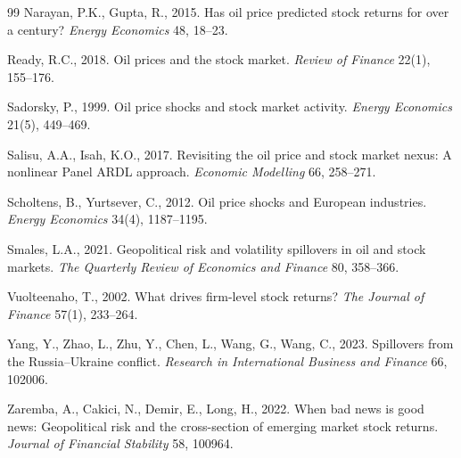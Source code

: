 \documentclass[12pt,preprint,authoryear]{elsarticle}
\begin{document}
\begin{thebibliography}{99}
Narayan, P.K., Gupta, R., 2015. Has oil price predicted stock returns for over a century? \textit{Energy Economics} 48, 18--23.

Ready, R.C., 2018. Oil prices and the stock market. \textit{Review of Finance} 22(1), 155--176.

Sadorsky, P., 1999. Oil price shocks and stock market activity. \textit{Energy Economics} 21(5), 449--469.

Salisu, A.A., Isah, K.O., 2017. Revisiting the oil price and stock market nexus: A nonlinear Panel ARDL approach. \textit{Economic Modelling} 66, 258--271.

Scholtens, B., Yurtsever, C., 2012. Oil price shocks and European industries. \textit{Energy Economics} 34(4), 1187--1195.

Smales, L.A., 2021. Geopolitical risk and volatility spillovers in oil and stock markets. \textit{The Quarterly Review of Economics and Finance} 80, 358--366.

Vuolteenaho, T., 2002. What drives firm-level stock returns? \textit{The Journal of Finance} 57(1), 233--264.

Yang, Y., Zhao, L., Zhu, Y., Chen, L., Wang, G., Wang, C., 2023. Spillovers from the Russia--Ukraine conflict. \textit{Research in International Business and Finance} 66, 102006.

Zaremba, A., Cakici, N., Demir, E., Long, H., 2022. When bad news is good news: Geopolitical risk and the cross-section of emerging market stock returns. \textit{Journal of Financial Stability} 58, 100964.
\end{thebibliography}
\end{document}
